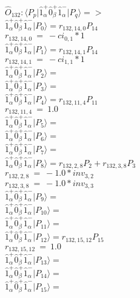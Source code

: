 \documentclass[14pt]{article}
\begin{document}
    $\hat{O}_{132}:  \langle{P_p}\vert \hat{1}_{\alpha}^{+}\hat{0}_{\beta}^{+}\hat{1}_{\alpha}^{-} \vert{P_q}\rangle => $ \\ 
    $ \hat{1}_{\alpha}^{+}\hat{0}_{\beta}^{+}\hat{1}_{\alpha}^{-} \vert{P_{0}}\rangle = {r}_{132,14,0}P_{14} $ \\ 
    ${r}_{132,14,0}\ =\ -{ci}_{0,1}*1 $ \\ 
    $ \hat{1}_{\alpha}^{+}\hat{0}_{\beta}^{+}\hat{1}_{\alpha}^{-} \vert{P_{1}}\rangle = {r}_{132,14,1}P_{14} $ \\ 
    ${r}_{132,14,1}\ =\ -{ci}_{1,1}*1 $ \\ 
    $ \hat{1}_{\alpha}^{+}\hat{0}_{\beta}^{+}\hat{1}_{\alpha}^{-} \vert{P_{2}}\rangle =  $ \\ 
    $ \hat{1}_{\alpha}^{+}\hat{0}_{\beta}^{+}\hat{1}_{\alpha}^{-} \vert{P_{3}}\rangle =  $ \\ 
    $ \hat{1}_{\alpha}^{+}\hat{0}_{\beta}^{+}\hat{1}_{\alpha}^{-} \vert{P_{4}}\rangle = {r}_{132,11,4}P_{11} $ \\ 
    ${r}_{132,11,4}\ =\ 1.0 $ \\ 
    $ \hat{1}_{\alpha}^{+}\hat{0}_{\beta}^{+}\hat{1}_{\alpha}^{-} \vert{P_{5}}\rangle =  $ \\ 
    $ \hat{1}_{\alpha}^{+}\hat{0}_{\beta}^{+}\hat{1}_{\alpha}^{-} \vert{P_{6}}\rangle =  $ \\ 
    $ \hat{1}_{\alpha}^{+}\hat{0}_{\beta}^{+}\hat{1}_{\alpha}^{-} \vert{P_{7}}\rangle =  $ \\ 
    $ \hat{1}_{\alpha}^{+}\hat{0}_{\beta}^{+}\hat{1}_{\alpha}^{-} \vert{P_{8}}\rangle = {r}_{132,2,8}P_{2}+{r}_{132,3,8}P_{3} $ \\ 
    ${r}_{132,2,8}\ =\ -1.0*{inv}_{3,2} $ \\ 
    ${r}_{132,3,8}\ =\ -1.0*{inv}_{3,3} $ \\ 
    $ \hat{1}_{\alpha}^{+}\hat{0}_{\beta}^{+}\hat{1}_{\alpha}^{-} \vert{P_{9}}\rangle =  $ \\ 
    $ \hat{1}_{\alpha}^{+}\hat{0}_{\beta}^{+}\hat{1}_{\alpha}^{-} \vert{P_{10}}\rangle =  $ \\ 
    $ \hat{1}_{\alpha}^{+}\hat{0}_{\beta}^{+}\hat{1}_{\alpha}^{-} \vert{P_{11}}\rangle =  $ \\ 
    $ \hat{1}_{\alpha}^{+}\hat{0}_{\beta}^{+}\hat{1}_{\alpha}^{-} \vert{P_{12}}\rangle = {r}_{132,15,12}P_{15} $ \\ 
    ${r}_{132,15,12}\ =\ 1.0 $ \\ 
    $ \hat{1}_{\alpha}^{+}\hat{0}_{\beta}^{+}\hat{1}_{\alpha}^{-} \vert{P_{13}}\rangle =  $ \\ 
    $ \hat{1}_{\alpha}^{+}\hat{0}_{\beta}^{+}\hat{1}_{\alpha}^{-} \vert{P_{14}}\rangle =  $ \\ 
    $ \hat{1}_{\alpha}^{+}\hat{0}_{\beta}^{+}\hat{1}_{\alpha}^{-} \vert{P_{15}}\rangle =  $ \\ 
    
\end{document}
